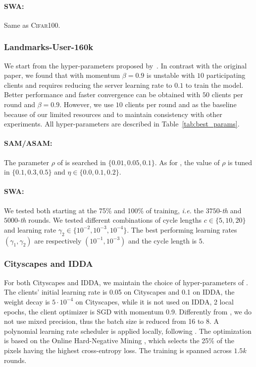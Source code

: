 \paragraph{SWA:} Same as \textsc{Cifar100}.

\subsubsection{Landmarks-User-160k} We start from the hyper-parameters proposed by~\cite{hsu2020federated}. In contrast with the original paper, we found that \fedavgm with momentum $\beta=0.9$ is unstable with $10$ participating clients and requires reducing the server learning rate to $0.1$ to train the model. Better performance and faster convergence can be obtained with $50$ clients per round and $\beta=0.9$. However, we use $10$ clients per round and \fedavg as the baseline because of our limited resources and to maintain consistency with other experiments. All hyper-parameters are described in Table~\ref{tab:best_params}.

\paragraph{SAM/ASAM:} The parameter $\rho$ of \sam is searched in $\{0.01,0.05,0.1\}$. As for \asam, the value of $\rho$ is tuned in $\{0.1,0.3,0.5\}$ and $\eta\in\{0.0,0.1,0.2\}$.

\paragraph{SWA:} We tested both \swa starting at the 75\% and 100\% of training, \textit{i.e.} the $3750$-\textit{th} and $5000$-\textit{th} rounds. We tested different combinations of cycle lengths $c \in \{5, 10, 20\}$ and learning rate $\gamma_2 \in \{ 10^{-2}, 10^{-3} ,10^{-4}\}$. The best performing learning rates $(\gamma_1,\gamma_2)$ are respectively $(10^{-1},10^{-3})$ and the cycle length is $5$.

\subsubsection{Cityscapes and IDDA} For both Cityscapes and IDDA, we maintain the choice of hyper-parameters of \cite{fantauzzo2022feddrive}. The clients' initial learning rate is 0.05 on Cityscapes and 0.1 on IDDA, the weight decay is $5\cdot10^{-4}$ on Cityscapes, while it is not used on IDDA, 2 local epochs, the client optimizer is SGD with momentum 0.9. Differently from \cite{fantauzzo2022feddrive}, we do not use mixed precision, thus the batch size is reduced from 16 to 8. A polynomial learning rate scheduler is applied locally, following \cite{yu2021bisenet}. The optimization is based on the Online Hard-Negative Mining \cite{shrivastava2016training}, which selects the 25\% of the pixels having the highest cross-entropy loss. The training is spanned across $1.5k$ rounds. 

